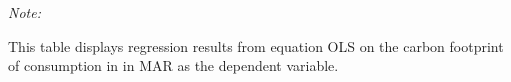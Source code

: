 \begin{table}[htbp!]
\begin{adjustbox}{width = 1\textwidth, max height = 0.95\textheight, center}
\begin{threeparttable}[b]
         \begin{tablenotes}\item \medskip \textit{Note:}
            \item This table displays regression results from equation OLS on the carbon footprint of consumption in  in MAR as the dependent variable.  
         \end{tablenotes}
      \end{threeparttable}
   \end{adjustbox}
\end{table}


